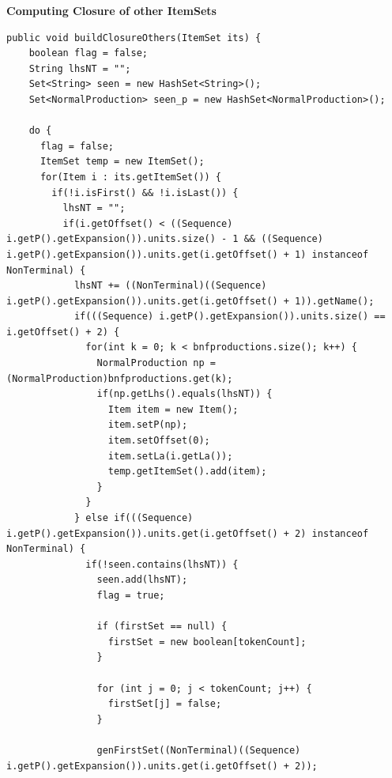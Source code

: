 \documentclass[oneside]{book}
\begin{document}
\textbf{Computing Closure of other ItemSets}
\begin{lstlisting}
public void buildClosureOthers(ItemSet its) {
    boolean flag = false;
    String lhsNT = "";
    Set<String> seen = new HashSet<String>();
    Set<NormalProduction> seen_p = new HashSet<NormalProduction>();
    
    do {
      flag = false;
      ItemSet temp = new ItemSet();
      for(Item i : its.getItemSet()) {
        if(!i.isFirst() && !i.isLast()) {
          lhsNT = "";
          if(i.getOffset() < ((Sequence) i.getP().getExpansion()).units.size() - 1 && ((Sequence) i.getP().getExpansion()).units.get(i.getOffset() + 1) instanceof NonTerminal) {
            lhsNT += ((NonTerminal)((Sequence) i.getP().getExpansion()).units.get(i.getOffset() + 1)).getName();
            if(((Sequence) i.getP().getExpansion()).units.size() == i.getOffset() + 2) {
              for(int k = 0; k < bnfproductions.size(); k++) {
                NormalProduction np = (NormalProduction)bnfproductions.get(k);
                if(np.getLhs().equals(lhsNT)) {
                  Item item = new Item();
                  item.setP(np);
                  item.setOffset(0);
                  item.setLa(i.getLa());
                  temp.getItemSet().add(item);
                }                
              }
            } else if(((Sequence) i.getP().getExpansion()).units.get(i.getOffset() + 2) instanceof NonTerminal) {
              if(!seen.contains(lhsNT)) {
                seen.add(lhsNT);
                flag = true;
              
                if (firstSet == null) {
                  firstSet = new boolean[tokenCount];
                }
              
                for (int j = 0; j < tokenCount; j++) {
                  firstSet[j] = false;
                }
          
                genFirstSet((NonTerminal)((Sequence) i.getP().getExpansion()).units.get(i.getOffset() + 2));
              

\end{lstlisting}
\end{document}
